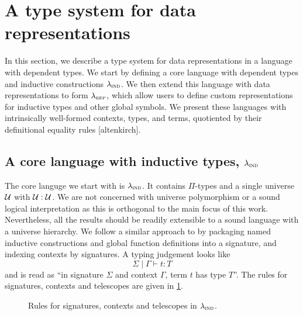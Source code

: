 \section{A type system for data representations}\label{sec:type-system}

In this section, we describe a type system for data representations in a
language with dependent types. We start by defining a core language with
dependent types and inductive constructions $\lambda_{\textsc{ind}}$. We then extend this
language with data representations to form $\lambda_{\textsc{rep}}$, which allow users to
define custom representations for inductive types and other global symbols.
We present these languages with intrinsically well-formed contexts, types, and
terms, quotiented by their definitional equality rules [altenkirch].

\subsection{A core language with inductive types, $\lambda_{\textsc{ind}}$}\label{sub:lambdaind}

The core languge we start with is $\lambda_{\textsc{ind}}$. It contains $\Pi$-types and a
single universe $\mathcal{U}$ with $\mathcal{U} : \mathcal{U}$. We are not concerned with universe
polymorphism or a sound logical interpretation as this is orthogonal to the main
focus of this work. Nevertheless, all the results should be readily extensible
to a sound language with a universe hierarchy.
We follow a similar approach to
\cite{Cockx2018-fk} by packaging named inductive constructions and
global function definitions into a signature, and indexing contexts by
signatures. A typing judgement looks like
\[
  \Sigma \mid \Gamma \vdash t : T
\]
and is read as ``in signature $\Sigma$ and context $\Gamma$, term $t$ has type
$T$''. The rules for signatures, contexts and telescopes are given in \cref{fig:lambdaind-sig-rules}.

\newcommand{\ValidCase}{\mta{ValidCase}}

\begin{figure}[h]
  \caption{Rules for signatures, contexts and telescopes in $\lambda_{\textsc{ind}}$.}
  \label{fig:lambdaind-sig-rules}
\end{figure}

